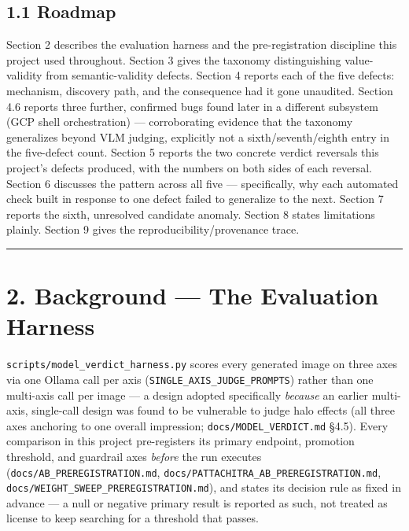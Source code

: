 \hypertarget{roadmap}{%
\subsection{1.1 Roadmap}\label{roadmap}}

Section 2 describes the evaluation harness and the pre-registration
discipline this project used throughout. Section 3 gives the taxonomy
distinguishing value-validity from semantic-validity defects. Section 4
reports each of the five defects: mechanism, discovery path, and the
consequence had it gone unaudited. Section 4.6 reports three further,
confirmed bugs found later in a different subsystem (GCP shell
orchestration) --- corroborating evidence that the taxonomy generalizes
beyond VLM judging, explicitly not a sixth/seventh/eighth entry in the
five-defect count. Section 5 reports the two concrete verdict reversals
this project's defects produced, with the numbers on both sides of each
reversal. Section 6 discusses the pattern across all five ---
specifically, why each automated check built in response to one defect
failed to generalize to the next. Section 7 reports the sixth,
unresolved candidate anomaly. Section 8 states limitations plainly.
Section 9 gives the reproducibility/provenance trace.

\begin{center}\rule{0.5\linewidth}{0.5pt}\end{center}

\hypertarget{background-the-evaluation-harness}{%
\section{2. Background --- The Evaluation
Harness}\label{background-the-evaluation-harness}}

\texttt{scripts/model\_verdict\_harness.py} scores every generated image
on three axes via one Ollama call per axis
(\texttt{SINGLE\_AXIS\_JUDGE\_PROMPTS}) rather than one multi-axis call
per image --- a design adopted specifically \emph{because} an earlier
multi-axis, single-call design was found to be vulnerable to judge halo
effects (all three axes anchoring to one overall impression;
\texttt{docs/MODEL\_VERDICT.md} §4.5). Every comparison in this project
pre-registers its primary endpoint, promotion threshold, and guardrail
axes \emph{before} the run executes
(\texttt{docs/AB\_PREREGISTRATION.md},
\texttt{docs/PATTACHITRA\_AB\_PREREGISTRATION.md},
\texttt{docs/WEIGHT\_SWEEP\_PREREGISTRATION.md}), and states its
decision rule as fixed in advance --- a null or negative primary result
is reported as such, not treated as license to keep searching for a
threshold that passes.

